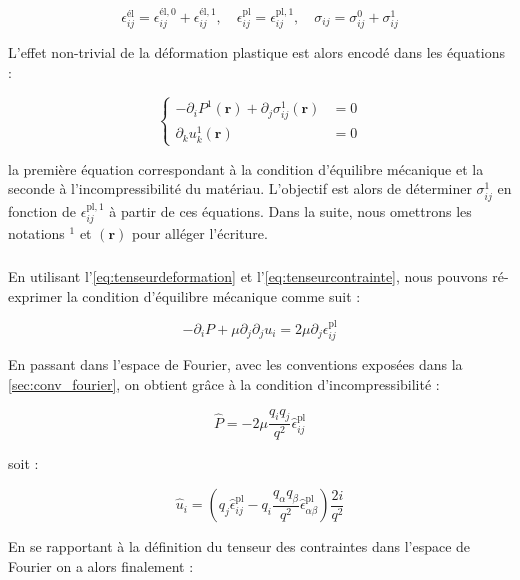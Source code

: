 \begin{equation}
	\epsilon_{ij}^{\text{él}} = \epsilon_{ij}^{\text{él}, 0} + \epsilon_{ij}^{\text{él}, 1}, \quad \epsilon_{ij}^{\text{pl}} = \epsilon_{ij}^{\text{pl}, 1}, \quad \sigma_{ij} = \sigma_{ij}^0 + \sigma_{ij}^1
\end{equation}

\noindent L'effet non-trivial de la déformation plastique est alors encodé dans les équations :

\begin{equation}
\left\{
\begin{aligned}
	-\partial_i P^1(\mathbf{r}) + \partial_j\sigma_{ij}^1(\mathbf{r}) &= 0\\
	\partial_k u^1_k(\mathbf{r})&=0
	\end{aligned}
	\right.
\end{equation}

\noindent la première équation correspondant à la condition d'équilibre mécanique et la seconde à l'incompressibilité du matériau. L'objectif est alors de déterminer $\sigma_{ij}^1$ en fonction de $\epsilon_{ij}^{\text{pl},1}$ à partir de ces équations. Dans la suite, nous omettrons les notations $^1$ et $(\mathbf{r})$ pour alléger l'écriture.

\subparagraph{}En utilisant l'\autoref{eq:tenseurdeformation} et l'\autoref{eq:tenseurcontrainte}, nous pouvons ré-exprimer la condition d'équilibre mécanique comme suit :

\begin{equation}
	-\partial_i P + \mu \partial_j\partial_j u_i = 2\mu \partial_j\epsilon_{ij}^\text{pl}
\end{equation}

\noindent En passant dans l'espace de Fourier, avec les conventions exposées dans la \autoref{sec:conv_fourier}, on obtient grâce à la condition d'incompressibilité :

\begin{equation}
	\hat{P} = -2\mu\frac{q_iq_j}{q^2}\hat{\epsilon}_{ij}^\text{pl}
\end{equation}

\noindent soit :

\begin{equation}
	\hat{u}_i = \left( q_j\hat{\epsilon}_{ij}^\text{pl}-q_i\frac{q_\alpha q_\beta}{q^2}\hat{\epsilon}_{\alpha\beta}^\text{pl} \right)\frac{2i}{q^2}
\end{equation}

\noindent En se rapportant à la définition du tenseur des contraintes dans l'espace de Fourier on a alors finalement :

